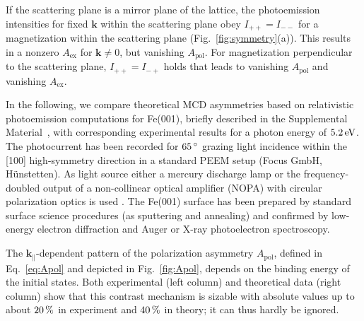 \documentclass[prl,twocolumn,floatfix,superscriptaddress,aps]{revtex4-2}
\renewcommand{\vec}[1]{\boldsymbol{#1}}
\begin{document}
If the scattering plane is a mirror plane of the lattice, the photoemission intensities for fixed $\vec{k}$ within the scattering plane obey $I_{+ +} = I_{- -}$ for a magnetization within the scattering plane (Fig.~\ref{fig:symmetry}(a)). This results in a nonzero $A_{\mathrm{ex}}$ for $\vec{k}\neq 0$, but vanishing $A_{\mathrm{pol}}$. For magnetization perpendicular to the scattering plane, $I_{+ +} = I_{- +}$ holds that leads to vanishing $A_{\mathrm{pol}}$ and vanishing $A_{\mathrm{ex}}$.
 

In the following, we compare theoretical MCD asymmetries based on relativistic photoemission computations for Fe(001), briefly described in the Supplemental Material~\cite{Supplement}, with corresponding experimental results for a photon energy of $\unit[5.2]{eV}$. The photocurrent has been recorded for $\unit[65]{^{\circ}}$ grazing light incidence within the [100] high-symmetry direction in a standard PEEM setup (Focus GmbH, H\"{u}nstetten). As light source either a mercury discharge lamp or the frequency-doubled output of a non-collinear optical amplifier (NOPA) with circular polarization optics is used \cite{duncker2012,gillmeister2020, paleschke2021}. The Fe(001) surface has been prepared by standard surface science procedures (as sputtering and annealing) and confirmed by low-energy electron diffraction and Auger or X-ray photoelectron spectroscopy.


The $\vec{k}_{\parallel}$-dependent pattern of the polarization asymmetry $A_{\mathrm{pol}}$, defined in Eq.~\eqref{eq:Apol} and depicted in Fig.~\ref{fig:Apol}, depends on the binding energy of the initial states. Both experimental (left column) and theoretical data (right column) show that this contrast mechanism is sizable with absolute values up to about $\unit[20]{\%}$ in experiment and $\unit[40]{\%}$ in theory; it can thus hardly be ignored. 
\end{document}
